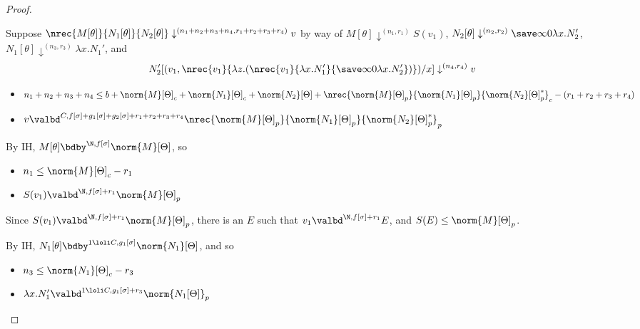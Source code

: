 \begin{proof}
\begin{itemize}
Suppose $\nrec {M[\theta]} {N_1[\theta]} {N_2[\theta]} \downarrow^{(n_1+n_2+n_3+n_4,r_1+r_2+r_3+r_4)} v$ by way of 
$M[\theta] \downarrow^{(n_1,r_1)} S(v_1)$, 
$N_2[\theta] \downarrow^{(n_2,r_2)} \save \infty 0 {\lambda x.N_2'}$, 
$N_1[\theta] \downarrow^{(n_3,r_3)} \lambda x.N_1'$, and 
$$N_2'[(v_1,\nrec {v_1} {\lambda z. {(\nrec {v_1} {\lambda x.N_1'} {\save \infty 0 {\lambda x.N_2'}})}})/x] \downarrow^{(n_4,r_4)} v$$
\begin{itemize}
  \item $n_1 + n_2 + n_3 + n_4 \leq b + \norm{M}[\Theta]_c + \norm{N_1}[\Theta]_c + \norm{N_2}[\Theta] + \nrec {\norm{M}[\Theta]_p} {\norm{N_1}[\Theta]_p} {\norm{N_2}[\Theta]_p^*}_c - (r_1+r_2+r_3+r_4)$
  \item $v \valbd^{C,f[\sigma] + g_1[\sigma] + g_2[\sigma] + r_1+r_2+r_3+r_4} \nrec {\norm{M}[\Theta]_p} {\norm{N_1}[\Theta]_p} {\norm{N_2}[\Theta]_p^*}_p$
\end{itemize}

By IH, $M[\theta] \bdby^{\N,f[\sigma]} \norm{M}[\Theta]$, so
\begin{itemize}
  \item $n_1 \leq \norm{M}[\Theta]_c - r_1$
  \item $S(v_1) \valbd^{\N,f[\sigma] + r_1} \norm{M}[\Theta]_p$
\end{itemize}
Since $S(v_1) \valbd^{\N,f[\sigma] + r_1} \norm{M}[\Theta]_p$, there is an $E$ such that $v_1 \valbd^{\N,f[\sigma] + r_1} E$, and $S(E) \leq \norm{M}[\Theta]_p$.

By IH, $N_1[\theta] \bdby^{1 \loli C,g_1[\sigma]} \norm{N_1}[\Theta]$, and so
\begin{itemize}
  \item $n_3 \leq \norm{N_1}[\Theta]_c - r_3$
  \item $\lambda x.N_1' \valbd^{1 \loli C,g_1[\sigma] + r_3} \norm{N_1[\Theta]}_p$
\end{itemize}


\end{itemize}
\end{proof}
